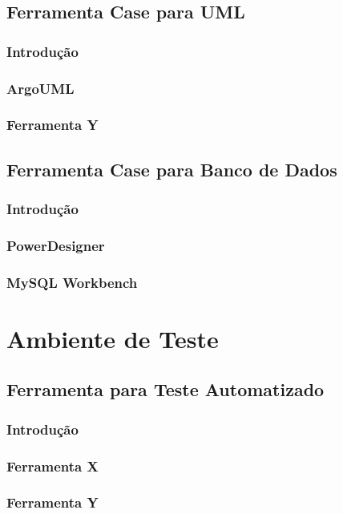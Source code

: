 \documentclass[12pt,a4paper]{article}
\begin{document}
	\subsection{Ferramenta Case para UML}
		\subsubsection{Introdução}
		\subsubsection{ArgoUML}
		\subsubsection{Ferramenta Y}

	\subsection{Ferramenta Case para Banco de Dados}
		\subsubsection{Introdução}
		\subsubsection{PowerDesigner}
		\subsubsection{MySQL Workbench}
		
\clearpage
\section{Ambiente de Teste}
	\subsection{Ferramenta para Teste Automatizado}
		\subsubsection{Introdução}
		\subsubsection{Ferramenta X}
		\subsubsection{Ferramenta Y}
		
\end{document}
